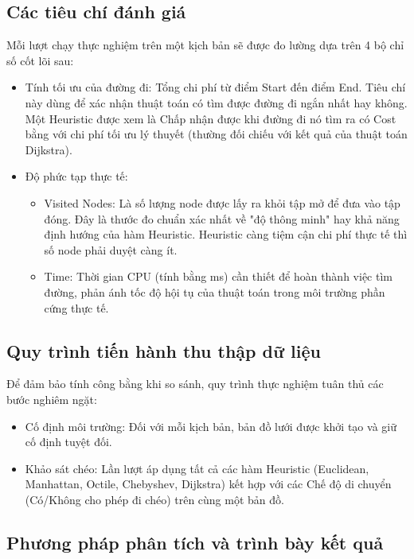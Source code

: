 \documentclass[12pt,a4paper]{report}
\begin{document}
\subsection{\textbf{Các tiêu chí đánh giá }}

Mỗi lượt chạy thực nghiệm trên một kịch bản sẽ được đo lường dựa trên 4 bộ chỉ số cốt lõi sau:

\begin{itemize}
    \item Tính tối ưu của đường đi: Tổng chi phí từ điểm Start đến điểm End. Tiêu chí này dùng để xác nhận thuật toán có tìm được đường đi ngắn nhất hay không. Một Heuristic được xem là Chấp nhận được khi đường đi nó tìm ra có Cost bằng với chi phí tối ưu lý thuyết (thường đối chiếu với kết quả của thuật toán Dijkstra).
    \item Độ phức tạp thực tế:
    \begin{itemize}
        \item Visited Nodes: Là số lượng node được lấy ra khỏi tập mở để đưa vào tập đóng. Đây là thước đo chuẩn xác nhất về "độ thông minh" hay khả năng định hướng của hàm Heuristic. Heuristic càng tiệm cận chi phí thực tế thì số node phải duyệt càng ít.
        \item Time: Thời gian CPU (tính bằng ms) cần thiết để hoàn thành việc tìm đường, phản ánh tốc độ hội tụ của thuật toán trong môi trường phần cứng thực tế.
    \end{itemize}
\end{itemize}

\subsection{Quy trình tiến hành thu thập dữ liệu}

Để đảm bảo tính công bằng khi so sánh, quy trình thực nghiệm tuân thủ các bước nghiêm ngặt:

\begin{itemize}
    \item Cố định môi trường: Đối với mỗi kịch bản, bản đồ lưới được khởi tạo và giữ cố định tuyệt đối.
    \item Khảo sát chéo: Lần lượt áp dụng tất cả các hàm Heuristic (Euclidean, Manhattan, Octile, Chebyshev, Dijkstra) kết hợp với các Chế độ di chuyển (Có/Không cho phép đi chéo) trên cùng một bản đồ.
\end{itemize}

\subsection{Phương pháp phân tích và trình bày kết quả}
\end{document}
